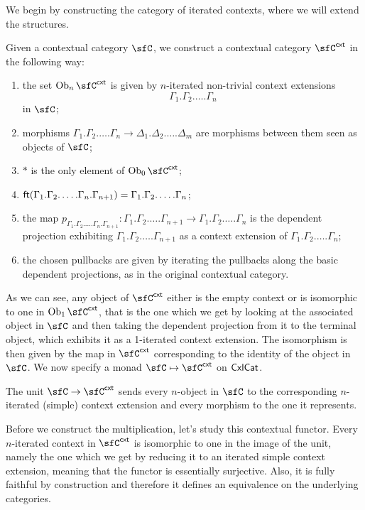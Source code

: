 \noindent
We begin by constructing the category of iterated contexts, where we
will extend the structures.

\begin{construction}\cite[21]{Lum10}
  Given a contextual category $\sfC$, we construct a contextual category
  $\sfC^{\cxt}$ in the following way:
  \begin{enumerate}
    \item the set $\Ob_n\sfC^{\cxt}$ is given by $n$-iterated non-trivial context
      extensions
      \[\Gamma_1.\Gamma_2.\ldots.\Gamma_n\]
      in $\sfC$;
    \item morphisms
      $\Gamma_1.\Gamma_2.\ldots.\Gamma_n\rightarrow\Delta_1.\Delta_2.\ldots.\Delta_m$
      are morphisms between them seen as objects of $\sfC$;
    \item $*$ is the only element of $\Ob_0\sfC^{\cxt}$;
    \item
      $\operatorname{\mathsf{ft}}(\Gamma_1.\Gamma_2.\ldots.\Gamma_n.\Gamma_{n+1})=\Gamma_1.\Gamma_2.\ldots.\Gamma_n$;
    \item the map $p_{\Gamma_1.\Gamma_2.\ldots.\Gamma_n.\Gamma_{n+1}}\colon
      \Gamma_1.\Gamma_2.\ldots.\Gamma_{n+1}\rightarrow
      \Gamma_1.\Gamma_2.\ldots.\Gamma_n$ is the dependent projection exhibiting
      $\Gamma_1.\Gamma_2.\ldots.\Gamma_{n+1}$ as a context extension of
      $\Gamma_1.\Gamma_2.\ldots.\Gamma_n$;
    \item the chosen pullbacks are given by iterating the pullbacks along the
      basic dependent projections, as in the original contextual category.
  \end{enumerate}

  \noindent
  As we can see, any object of $\sfC^{\cxt}$ either is the empty context or is
  isomorphic to one in
  $\Ob_1\sfC^{\cxt}$, that is the one which we get by looking at the associated object
  in $\sfC$ and then taking the dependent projection from it to the terminal
  object, which exhibits it as a 1-iterated context extension. The isomorphism
  is then given by the map in $\sfC^{\cxt}$ corresponding to the identity of the
  object in $\sfC$. We now specify a monad $\sfC\mapsto\sfC^{\cxt}$ on $\operatorname{\mathsf{CxlCat}}$.

  \noindent
  The unit $\sfC\rightarrow\sfC^{\cxt}$ sends every $n$-object in $\sfC$ to
  the corresponding $n$-iterated (simple) context extension and every morphism
  to the one it represents.

  \noindent
  Before we construct the multiplication, let's study this contextual functor.
  Every $n$-iterated
  context in $\sfC^{\cxt}$ is isomorphic to one in the image of the unit, namely
  the one which we get by reducing it to an iterated simple context extension,
  meaning that the functor is essentially surjective. Also, it is fully faithful
  by construction and therefore it defines an equivalence on the underlying
  categories.


\end{construction}
